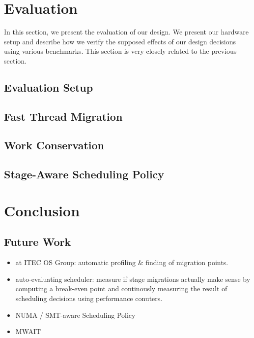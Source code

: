 \documentclass[12pt,a4paper]{book}
\begin{document}

%
\blindtext

\chapter{Evaluation}\label{ch:eval}
In this section, we present the evaluation of our design.
We present our hardware setup and describe how we verify the supposed effects of our design decisions using various benchmarks.
This section is very closely related to the previous section.
\section{Evaluation Setup}
\section{Fast Thread Migration}
\section{Work Conservation}
\section{Stage-Aware Scheduling Policy}

\chapter{Conclusion}\label{ch:concl}
\blindtext
\section{Future Work}
\begin{itemize}
    \item at ITEC OS Group: automatic profiling \& finding of migration points.
    \item auto-evaluating scheduler: measure if stage migrations actually make sense by computing a break-even point and continously measuring the result of scheduling decisions using performance conuters.
    \item NUMA / SMT-aware Scheduling Policy
    \item MWAIT
\end{itemize}
\end{document}
